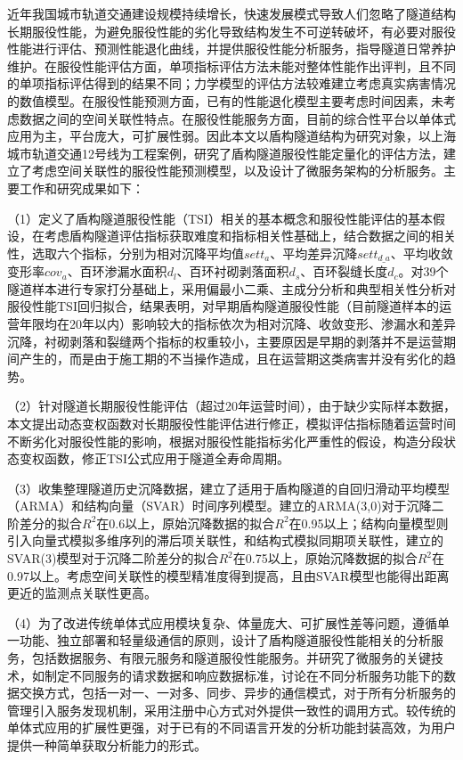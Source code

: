 
\begin{cabstract}

近年我国城市轨道交通建设规模持续增长，快速发展模式导致人们忽略了隧道结构长期服役性能，为避免服役性能的劣化导致结构发生不可逆转破坏，有必要对服役性能进行评估、预测性能退化曲线，并提供服役性能分析服务，指导隧道日常养护维护。在服役性能评估方面，单项指标评估方法未能对整体性能作出评判，且不同的单项指标评估得到的结果不同；力学模型的评估方法较难建立考虑真实病害情况的数值模型。在服役性能预测方面，已有的性能退化模型主要考虑时间因素，未考虑数据之间的空间关联性特点。在服役性能服务方面，目前的综合性平台以单体式应用为主，平台庞大，可扩展性弱。因此本文以盾构隧道结构为研究对象，以上海城市轨道交通12号线为工程案例，研究了盾构隧道服役性能定量化的评估方法，建立了考虑空间关联性的服役性能预测模型，以及设计了微服务架构的分析服务。主要工作和研究成果如下：

（1）定义了盾构隧道服役性能（TSI）相关的基本概念和服役性能评估的基本假设，在考虑盾构隧道评估指标获取难度和指标相关性基础上，结合数据之间的相关性，选取六个指标，分别为相对沉降平均值${sett}_{a}$、平均差异沉降$set{{t}_{d\_a}}$、平均收敛变形率${cov}_{a}$、百环渗漏水面积${d}_{l}$、百环衬砌剥落面积${d}_{s}$、百环裂缝长度${d}_{c}$。对39个隧道样本进行专家打分基础上，采用偏最小二乘、主成分分析和典型相关性分析对服役性能TSI回归拟合，结果表明，对早期盾构隧道服役性能（目前隧道样本的运营年限均在20年以内）影响较大的指标依次为相对沉降、收敛变形、渗漏水和差异沉降，衬砌剥落和裂缝两个指标的权重较小，主要原因是早期的剥落并不是运营期间产生的，而是由于施工期的不当操作造成，且在运营期这类病害并没有劣化的趋势。

（2）针对隧道长期服役性能评估（超过20年运营时间），由于缺少实际样本数据，本文提出动态变权函数对长期服役性能评估进行修正，模拟评估指标随着运营时间不断劣化对服役性能的影响，根据对服役性能指标劣化严重性的假设，构造分段状态变权函数，修正TSI公式应用于隧道全寿命周期。

（3）收集整理隧道历史沉降数据，建立了适用于盾构隧道的自回归滑动平均模型（ARMA）和结构向量（SVAR）时间序列模型。建立的ARMA(3,0)对于沉降二阶差分的拟合$R^2$在0.6以上，原始沉降数据的拟合$R^2$在0.95以上；结构向量模型则引入向量式模拟多维序列的滞后项关联性，和结构式模拟同期项关联性，建立的SVAR(3)模型对于沉降二阶差分的拟合$R^2$在0.75以上，原始沉降数据的拟合$R^2$在0.97以上。考虑空间关联性的模型精准度得到提高，且由SVAR模型也能得出距离更近的监测点关联性更高。

（4）为了改进传统单体式应用模块复杂、体量庞大、可扩展性差等问题，遵循单一功能、独立部署和轻量级通信的原则，设计了盾构隧道服役性能相关的分析服务，包括数据服务、有限元服务和隧道服役性能服务。并研究了微服务的关键技术，如制定不同服务的请求数据和响应数据标准，讨论在不同分析服务功能下的数据交换方式，包括一对一、一对多、同步、异步的通信模式，对于所有分析服务的管理引入服务发现机制，采用注册中心方式对外提供一致性的调用方式。较传统的单体式应用的扩展性更强，对于已有的不同语言开发的分析功能封装高效，为用户提供一种简单获取分析能力的形式。


\end{cabstract}
